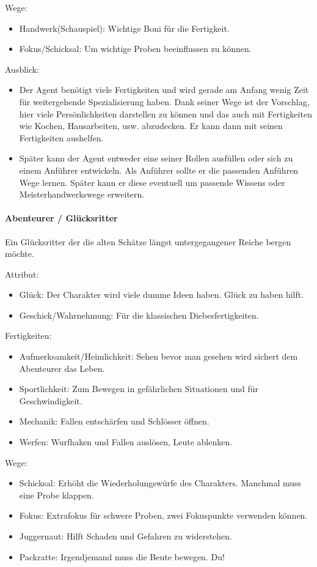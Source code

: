 \documentclass{article}
\begin{document}
Wege:
\begin{itemize}
\item Handwerk(Schauspiel): Wichtige Boni für die Fertigkeit.
\item Fokus/Schicksal: Um wichtige Proben beeinflussen zu können.
\end{itemize}

Ausblick:
\begin{itemize}
\item Der Agent benötigt viele Fertigkeiten und wird gerade am Anfang wenig Zeit für weitergehende Spezialisierung haben. Dank seiner Wege ist der Vorschlag, hier viele Persönlichkeiten darstellen zu können und das auch mit Fertigkeiten wie Kochen, Hausarbeiten, usw. abzudecken. Er kann dann mit seinen Fertigkeiten aushelfen.
\item Später kann der Agent entweder eine seiner Rollen ausfüllen oder sich zu einem Anführer entwickeln. Als Anführer sollte er die passenden Anführen Wege lernen. Später kann er diese eventuell um passende Wissens oder Meisterhandwerkswege erweitern.
\end{itemize}

\paragraph{Abenteurer / Glücksritter}
Ein Glücksritter der die alten Schätze längst untergegangener Reiche bergen möchte.

Attribut:
\begin{itemize}
\item Glück: Der Charakter wird viele dumme Ideen haben. Glück zu haben hilft.
\item Geschick/Wahrnehmung: Für die klassischen Diebesfertigkeiten.
\end{itemize}

Fertigkeiten:
\begin{itemize}
\item Aufmerksamkeit/Heimlichkeit: Sehen bevor man gesehen wird sichert dem Abenteurer das Leben.
\item Sportlichkeit: Zum Bewegen in gefährlichen Situationen und für Geschwindigkeit.
\item Mechanik: Fallen entschärfen und Schlösser öffnen.
\item Werfen: Wurfhaken und Fallen auslösen, Leute ablenken.
\end{itemize}

Wege:
\begin{itemize}
\item Schicksal: Erhöht die Wiederholungswürfe des Charakters. Manchmal muss eine Probe klappen.
\item Fokus: Extrafokus für schwere Proben, zwei Fokuspunkte verwenden können.
\item Juggernaut: Hilft Schaden und Gefahren zu widerstehen.
\item Packratte: Irgendjemand muss die Beute bewegen. Du!
\end{itemize}
\end{document}
